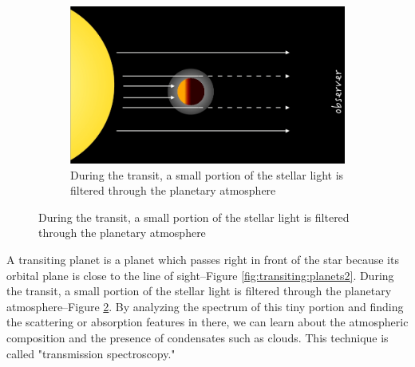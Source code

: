 \documentclass[]{article}
\begin{document}
\begin{figure}[H]
\begin{subfigure}[b]{0.3\textwidth}
	\end{subfigure}
	\;\;
	\begin{subfigure}[b]{0.31\textwidth}
		\caption{During the transit, a small portion
			of the stellar light
			is filtered through
			the planetary atmosphere}\label{fig:transiting:planets3}
		\includegraphics[width=\textwidth]{TransitingPlanets3}
	\end{subfigure}
\end{figure}

A transiting planet is a planet which
passes right in front of the star
because its orbital plane
is close to the line of sight--Figure \ref{fig:transiting:planets2}.
During the transit, a small portion
of the stellar light
is filtered through
the planetary atmosphere--Figure \ref{fig:transiting:planets3}.
By analyzing the spectrum
of this tiny portion
and finding the scattering
or absorption features in there,
we can learn about
the atmospheric composition
and the presence of condensates
such as clouds.
This technique is called
"transmission spectroscopy."
\end{document}
